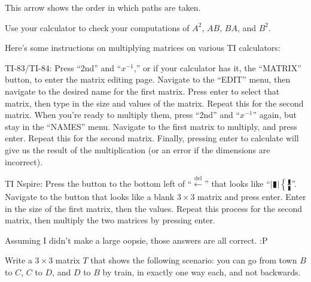\documentclass[../key.tex]{subfiles}
\begin{document}

This arrow shows the order in which paths are taken.

\begin{inner_problem}
\item Use your calculator to check your computations of $A^2$, $AB$, $BA$, and $B^2$.
\end{inner_problem}

Here's some instructions on multiplying matrices on various TI calculators:

TI-83/TI-84: Press ``2nd'' and ``$x^{-1}$,'' or if your calculator has it, the ``MATRIX'' button, to enter the matrix editing page. Navigate to the ``EDIT'' menu, then navigate to the desired name for the first matrix. Press enter to select that matrix, then type in the size and values of the matrix. Repeat this for the second matrix. When you're ready to multiply them, press ``2nd'' and ``$x^{-1}$'' again, but stay in the ``NAMES'' menu. Navigate to the first matrix to multiply, and press enter. Repeat this for the second matrix. Finally, pressing enter to calculate will give us the result of the multiplication (or an error if the dimensions are incorrect).

TI Nspire: Press the button to the bottom left of ``$\stackrel{\text{del}}{\leftarrow}$'' that looks like ``$|\vrectangleblack|\left\{\frac{\vrectangleblack}{\vrectangleblack}\right.$''. Navigate to the button that looks like a blank $3\times 3$ matrix and press enter. Enter in the size of the first matrix, then the values. Repeat this process for the second matrix, then multiply the two matrices by pressing enter.

Assuming I didn't make a large oopsie, those answers are all correct. :P

\begin{outer_problem}
\item Write a $3\times 3$ matrix $T$ that shows the following scenario: you can go from town $B$ to $C$, $C$ to $D$, and $D$ to $B$ by train, in exactly one way each, and not backwards.
\end{outer_problem}
\end{document}
